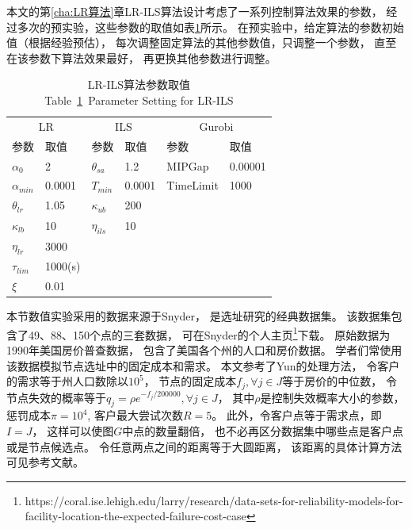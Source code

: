 本文的第\ref{cha:LR算法}章LR-ILS算法设计考虑了一系列控制算法效果的参数，
经过多次的预实验，这些参数的取值如表\ref{table:参数取值}所示。
在预实验中，给定算法的参数初始值（根据经验预估），
每次调整固定算法的其他参数值，只调整一个参数，
直至在该参数下算法效果最好，
再更换其他参数进行调整。
\vspace{-2ex}
\begin{table}[!htb]\normalsize   %
\setlength{\abovecaptionskip}{1ex} 

\centering
\renewcommand\arraystretch{0.8}
\caption{LR-ILS算法参数取值\\Table~\ref{table:参数取值}~Parameter Setting for LR-ILS}
\small{
	\begin{tabular}{p{1.6cm}<{\centering} p{1.6cm}<{\centering} p{1.6cm}<{\centering} p{1.6cm}<{\centering} p{1.6cm}<{\centering} p{1.6cm}<{\centering} }
		\toprule %
		\multicolumn{2}{c}{LR} & \multicolumn{2}{c}{ILS} & \multicolumn{2}{c}{Gurobi}\\
		\cmidrule(r){1-2} \cmidrule(r){3-4} \cmidrule(r){5-6}
		参数   & 取值 & 参数  & 取值 & 参数  &  取值 \\
		\midrule %
		$\alpha_0$      & 2      & $\theta_{sa}$  & 1.2    & MIPGap    & 0.00001\\
		$\alpha_{min}$  & 0.0001 & $T_{min}$      & 0.0001 & TimeLimit & 1000\\
		$\theta_{lr}$   & 1.05    & $\kappa_{ub}$  & 200\\
		$\kappa_{lb}$   & 10     & $\eta_{ils}$   & 10\\
		$\eta_{lr}$     & 3000  \\
		$\tau_{lim}$    & 1000(s)  \\
		$\xi$           & 0.01  \\
		\bottomrule %
	\end{tabular}
}
\vspace{-1ex}
\label{table:参数取值}
\end{table}

本节数值实验采用的数据来源于Snyder\cite{Snyder2005}，
是选址研究的经典数据集。
该数据集包含了49、88、150个点的三套数据，
可在Snyder\cite{Snyder2005}的个人主页\footnote{https:\slash \slash coral.ise.lehigh.edu\slash larry\slash research\slash data-sets-for-reliability-models-for-facility-location-the-expected-failure-cost-case}下载。
原始数据为1990年美国房价普查数据，
包含了美国各个州的人口和房价数据。
学者们常使用该数据模拟节点选址中的固定成本和需求\cite{Daskin书,Snyder2005,yun2015,Cui2010}。
本文参考了Yun\cite{yun2017}的处理方法，
令客户的需求等于州人口数除以$10^5$，
节点的固定成本$f_j, \forall j \in J$等于房价的中位数，
令节点失效的概率等于$q_j = \rho e^{-f_j/200000},\forall j \in J$，
其中$\rho$是控制失效概率大小的参数，
惩罚成本$\pi = 10^4$, 客户最大尝试次数$R=5$。
此外，令客户点等于需求点，即$I=J$，
这样可以使图$G$中点的数量翻倍，
也不必再区分数据集中哪些点是客户点或是节点候选点。
令任意两点之间的距离等于大圆距离，
该距离的具体计算方法可见参考文献\cite{Snyder2005,Yongzhen,yun2015}。


